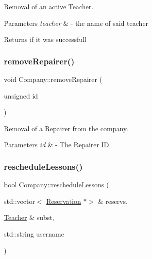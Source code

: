 Removal of an active \mbox{\hyperlink{class_teacher}{Teacher}}. 


\begin{DoxyParams}{Parameters}
{\em teacher} & -\/ the name of said teacher \\
\hline
\end{DoxyParams}
\begin{DoxyReturn}{Returns}
if it was successfull 
\end{DoxyReturn}
\mbox{\label{class_company_af7f0b784eb184ae92f5c8d0c8bad0f09}} 
\subsubsection{\texorpdfstring{remove\+Repairer()}{removeRepairer()}}
{\footnotesize\ttfamily void Company\+::remove\+Repairer (\begin{DoxyParamCaption}\item[{unsigned}]{id }\end{DoxyParamCaption})}



Removal of a Repairer from the company. 


\begin{DoxyParams}{Parameters}
{\em id} & -\/ The Repairer ID \\
\hline
\end{DoxyParams}
\mbox{\label{class_company_ae858645003e1a2cd2e38f6db4feda488}} 
\subsubsection{\texorpdfstring{reschedule\+Lessons()}{rescheduleLessons()}}
{\footnotesize\ttfamily bool Company\+::reschedule\+Lessons (\begin{DoxyParamCaption}\item[{std\+::vector$<$ \mbox{\hyperlink{class_reservation}{Reservation}} $\ast$$>$ \&}]{reservs,  }\item[{\mbox{\hyperlink{class_teacher}{Teacher}} \&}]{subst,  }\item[{std\+::string}]{username }\end{DoxyParamCaption})}



